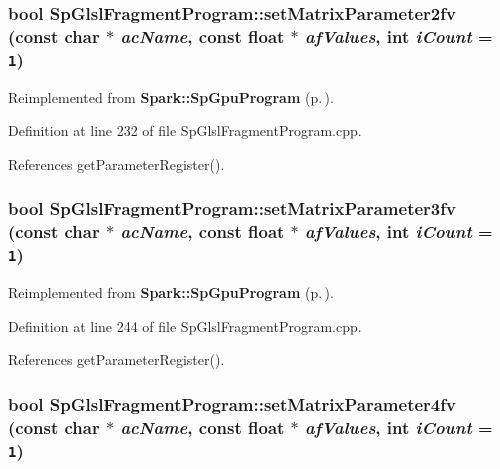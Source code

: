 \subsubsection{\setlength{\rightskip}{0pt plus 5cm}bool Sp\-Glsl\-Fragment\-Program::set\-Matrix\-Parameter2fv (const char $\ast$ {\em ac\-Name}, const float $\ast$ {\em af\-Values}, int {\em i\-Count} = {\tt 1})\hspace{0.3cm}{\tt  [virtual]}}\label{classSpark_1_1SpGlslFragmentProgram_a17}




Reimplemented from {\bf Spark::Sp\-Gpu\-Program} {\rm (p.\,\pageref{classSpark_1_1SpGpuProgram_a28})}.

Definition at line 232 of file Sp\-Glsl\-Fragment\-Program.cpp.

References get\-Parameter\-Register().
\subsubsection{\setlength{\rightskip}{0pt plus 5cm}bool Sp\-Glsl\-Fragment\-Program::set\-Matrix\-Parameter3fv (const char $\ast$ {\em ac\-Name}, const float $\ast$ {\em af\-Values}, int {\em i\-Count} = {\tt 1})\hspace{0.3cm}{\tt  [virtual]}}\label{classSpark_1_1SpGlslFragmentProgram_a18}




Reimplemented from {\bf Spark::Sp\-Gpu\-Program} {\rm (p.\,\pageref{classSpark_1_1SpGpuProgram_a29})}.

Definition at line 244 of file Sp\-Glsl\-Fragment\-Program.cpp.

References get\-Parameter\-Register().
\subsubsection{\setlength{\rightskip}{0pt plus 5cm}bool Sp\-Glsl\-Fragment\-Program::set\-Matrix\-Parameter4fv (const char $\ast$ {\em ac\-Name}, const float $\ast$ {\em af\-Values}, int {\em i\-Count} = {\tt 1})\hspace{0.3cm}{\tt  [virtual]}}\label{classSpark_1_1SpGlslFragmentProgram_a19}




